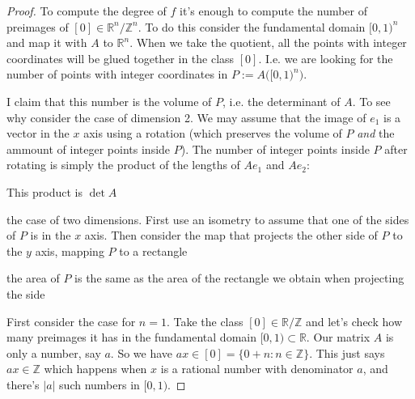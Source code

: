 \begin{proof}\leavevmode
	To compute the degree of \(f \) it's enough to compute the number of preimages of \([0] \in \mathbb{R}^n/\mathbb{Z}^n\). To do this consider the fundamental domain \([0,1)^n\) and map it with \(A\) to  \(\mathbb{R}^n\). When we take the quotient, all the points with integer coordinates will be glued together in the class \([0]\). I.e. we are looking for the number of points with integer coordinates in \(P:=A\Big( [0,1)^n \Big)\).

	I claim that this number is the volume of \(P\), i.e. the determinant of  \(A\). To see why consider the case of dimension 2. We may assume that the image of \(e_1\) is a vector in the \(x\) axis using a rotation (which preserves the volume of \(P\) \textit{and} the ammount of integer points inside \(P\)). The number of integer points inside \(P\) after rotating is simply the product of the lengths of \(Ae_1\) and \(Ae_2\):


	This product is \(\det A\)


	the case of two dimensions. First use an isometry to assume that one of the sides of \(P\) is in the \(x\) axis. Then consider the map that projects the other side of \(P\) to the \(y\) axis, mapping \(P\) to a rectangle

	the area of \(P\) is the same as the area of the rectangle we obtain when projecting the side






\iffalse
	First consider the case for \(n=1\). Take the class \([0] \in \mathbb{R}/\mathbb{Z}\) and let's check how many preimages it has in the fundamental domain \([0,1) \subset \mathbb{R}\). Our matrix \(A\) is only a number, say \(a\). So we have \(ax \in [0]=\{0+n:n \in \mathbb{Z}\}\). This just says \(ax \in \mathbb{Z}\) which happens when \(x\) is a rational number with  denominator \(a\), and there's  \(|a|\) such numbers in \([0,1)\).


\end{proof}
